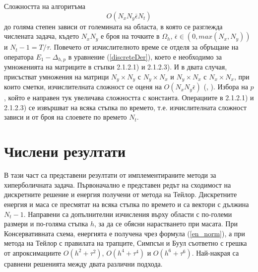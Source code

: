 \documentclass{article}
\newcommand{\rf}[1]{(\ref{#1})}
\begin{document}
Сложността на алгоритъма 
$$ O(N_x N_y \bar \epsilon N_t ) $$
до голяма степен зависи от големината на областа, в която се разглежда числената задача, където $N_x N_y$ е броя на точките в $\Omega_h$, $\bar\epsilon \in (0, max(N_x,N_y) )$ и $N_t -1= T/\tau$. Повечето от изчислителното време се отделя за обръщане на оператора $E_1-\Delta_{h,p}$ в уравнение \rf{discreteDer}, което е необходимо за умноженията на матриците в стъпки 2.1.2.1) и 2.1.2.3). И в двата случая, присъстват умножения на матрици $N_y \times N_y$ с  $N_y \times N_x$ и $N_y \times N_x$ с  $N_x \times N_x$, при които сметки, изчислителната сложност се оценя на $ O( N_x N_y \bar\epsilon)$ (\cite{ref26}, \cite{ref27}). Избора на $p$, който е направен тук увеличава сложността с константа. Операциите в 2.1.2.1) и 2.1.2.3) се извършват на всяка стъпка по времето, т.е. изчислителната сложност зависи и от броя на слоевете по времето $N_t$.

\section{Числени резултати}
В тази част са представени резултати от имплементираните методи за хиперболичната задача.
Първоначално е представен редът на сходимост на дискретните решение и енергия получени от метода на Тейлор. Дискретните енергия и маса се пресмятат на всяка стъпка по времето и са вектори с дължина $N_t - 1$. Направени са допълнителни изчисления върху области с по-големи размери и по-голяма стъпка $h$, за да се обясни нарастването при масата. При Консервативната схема, енергията е получена чрез формула \rf{en_norm}, а при метода на Тейлор с правилата на трапците, Симпсън и Буул съответно с грешка от апроксимациите $O(h^{2} + \tau^2 )$, $O(h^{4} + \tau^4 )$ и $O(h^{6} + \tau^6 )$. Най-накрая са сравнени решенията между двата различни подхода. 
\end{document}
